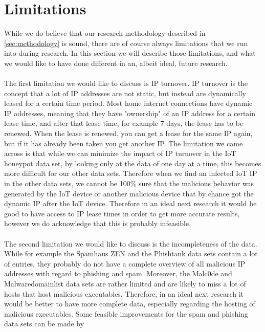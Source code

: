 \documentclass[a4paper,10pt]{article}
\begin{document}
\section{Limitations} \label{sec:limitations}
While we do believe that our research methodology described in \autoref{sec:methodology} is sound, there are of course always 
limitations that we run into during research. In this section we will describe those limitations, and  what we would like to have 
done different in an, albeit ideal, future research.
\\\\
The first limitation we would like to discuss is IP turnover. IP turnover is the concept that a lot of IP addresses are not static, but instead are
dynamically leased for a certain time period. Most home internet connections have dynamic IP addresses, meaning that they have
"ownership" of an IP address for a certain lease time, and after that lease time, for example 7 days, the lease has to be renewed. When
the lease is renewed, you can get a lease for the same IP again, but if it has already been taken you get another IP. The limitation
we came across is that while we can minimize the impact of IP turnover in the IoT honeypot data set, by looking only at the data of
one day at a time, this becomes more difficult for our other data sets. Therefore when we find an infected IoT IP in the other data sets,
we cannot be 100\% sure that the malicious behavior was generated by the IoT device or another malicious device that by chance
got the dynamic IP after the IoT device. Therefore in an ideal next research it would be good to have access to IP lease times in order
to get more accurate results, however we do acknowledge that this is probably infeasible.
\\\\
The second limitation we would like to discuss is the incompleteness of the data. While for example the Spamhaus ZEN and the 
Phishtank data sets contain a lot of entries, they probably do not have a complete overview of all malicious IP addresses with regard
to phishing and spam. Moreover, the Malc0de and Malwaredomainlist data sets are rather limited and are likely to miss a lot of 
hosts that host malicious executables. Therefore, in an ideal next research it would be better to have more complete data, especially
regarding the hosting of malicious executables. Some feasible improvements for the spam and phishing data sets can be made by 
\end{document}
